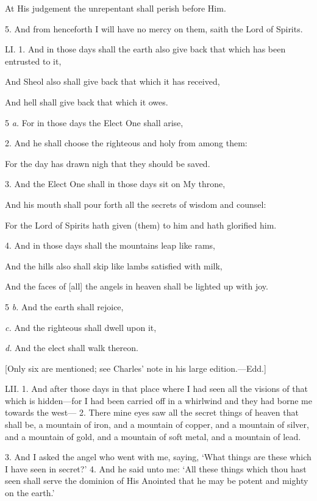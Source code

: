 At His judgement the unrepentant shall perish before Him.

5. And from henceforth I will have no mercy on them, saith the Lord of Spirits.


LI. 1. And in those days shall the earth also give back that which has been entrusted to it,

And Sheol also shall give back that which it has received,

And hell shall give back that which it owes.

5 \emph{a.} For in those days the Elect One shall arise,

2. And he shall choose the righteous and holy from among them:

For the day has drawn nigh that they should be saved.

3. And the Elect One shall in those days sit on My throne,

And his mouth shall pour forth all the secrets of wisdom and counsel:

For the Lord of Spirits hath given (them) to him and hath glorified him.

4. And in those days shall the mountains leap like rams,

And the hills also shall skip like lambs satisfied with milk,

And the faces of [all] the angels in heaven shall be lighted up with joy.

5 \emph{b.} And the earth shall rejoice,

\emph{c.} And the righteous shall dwell upon it,

\emph{d.} And the elect shall walk thereon.


[Only six are mentioned; see Charles’ note in his large
edition.—Edd.]

LII. 1. And after those days in that place where
I had seen all the visions of that which is hidden—for
I had been carried off in a whirlwind and they had
borne me towards the west— 2. There mine eyes
saw all the secret things of heaven that shall be, a
mountain of iron, and a mountain of copper, and a
mountain of silver, and a mountain of gold, and a
mountain of soft metal, and a mountain of lead.

3. And I asked the angel who went with me, saying,
‘What things are these which I have seen in
secret?’ 4. And he said unto me: ‘All these things
which thou hast seen shall serve the dominion of
His Anointed that he may be potent and mighty on
the earth.’


